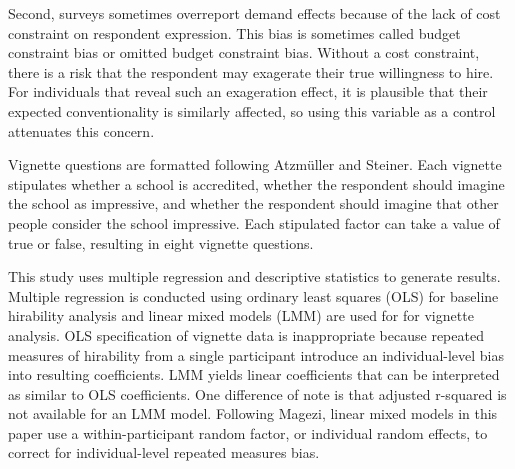 \documentclass[review]{elsarticle}
\begin{document}
Second, surveys sometimes overreport demand effects because of the lack of cost constraint on respondent expression.
This bias is sometimes called budget constraint bias or omitted budget constraint bias\cite{ahlheim1998contingent, pachali2020omitted}.
Without a cost constraint, there is a risk that the respondent may exagerate their true willingness to hire.
For individuals that reveal such an exageration effect,
it is plausible that their expected conventionality is similarly affected,
so using this variable as a control attenuates this concern.

Vignette questions are formatted following Atzm{\"u}ller and Steiner\cite{atzmuller2010experimental}.
Each vignette stipulates whether a school is accredited,
whether the respondent should imagine the school as impressive,
and whether the respondent should imagine that other people consider the school impressive.
Each stipulated factor can take a value of true or false,
resulting in eight vignette questions.

This study uses multiple regression and descriptive statistics to generate results.
Multiple regression is conducted using ordinary least squares (OLS)
for baseline hirability analysis
and linear mixed models (LMM)
are used for for vignette analysis.
OLS specification of vignette data is inappropriate because repeated measures of hirability
from a single participant introduce an individual-level bias into resulting coefficients.
LMM yields linear coefficients that can be interpreted as similar to OLS coefficients.
One difference of note is that adjusted r-squared is not available for an LMM model.
Following Magezi\cite{magezi2015linear},
linear mixed models in this paper use a within-participant random factor,
or individual random effects,
to correct for individual-level repeated measures bias.
\end{document}

